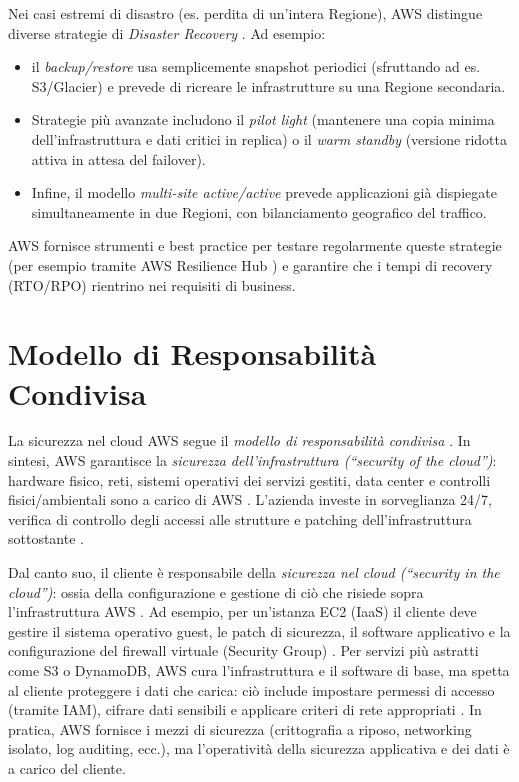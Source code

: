 Nei casi estremi di disastro (es. perdita di un’intera Regione), AWS distingue diverse strategie di \textit{Disaster Recovery} \cite{aws-well-architected}. Ad esempio:
\begin{itemize}
    \item il \textit{backup/restore} usa semplicemente snapshot periodici (sfruttando ad es. S3/Glacier) e prevede di ricreare le infrastrutture su una Regione secondaria.
    \item Strategie più avanzate includono il \textit{pilot light} (mantenere una copia minima dell’infrastruttura e dati critici in replica) o il \textit{warm standby} (versione ridotta attiva in attesa del failover).
    \item Infine, il modello \textit{multi-site active/active} prevede applicazioni già dispiegate simultaneamente in due Regioni, con bilanciamento geografico del traffico.
\end{itemize}
AWS fornisce strumenti e best practice per testare regolarmente queste strategie (per esempio tramite AWS Resilience Hub \cite{aws-resilience}) e garantire che i tempi di recovery (RTO/RPO) rientrino nei requisiti di business.

\section{Modello di Responsabilità Condivisa}
La sicurezza nel cloud AWS segue il \textit{modello di responsabilità condivisa} \cite{aws-shared-responsibility}. In sintesi, AWS garantisce la \textit{sicurezza dell’infrastruttura (“security of the cloud”)}: hardware fisico, reti, sistemi operativi dei servizi gestiti, data center e controlli fisici/ambientali sono a carico di AWS \cite{aws-shared-responsibility}. L’azienda investe in sorveglianza 24/7, verifica di controllo degli accessi alle strutture e patching dell’infrastruttura sottostante \cite{aws-shared-responsibility}.

Dal canto suo, il cliente è responsabile della \textit{sicurezza nel cloud (“security in the cloud”)}: ossia della configurazione e gestione di ciò che risiede sopra l’infrastruttura AWS \cite{aws-shared-responsibility}. Ad esempio, per un’istanza EC2 (IaaS) il cliente deve gestire il sistema operativo guest, le patch di sicurezza, il software applicativo e la configurazione del firewall virtuale (Security Group) \cite{aws-shared-responsibility}. Per servizi più astratti come S3 o DynamoDB, AWS cura l’infrastruttura e il software di base, ma spetta al cliente proteggere i dati che carica: ciò include impostare permessi di accesso (tramite IAM), cifrare dati sensibili e applicare criteri di rete appropriati \cite{aws-shared-responsibility}. In pratica, AWS fornisce i mezzi di sicurezza (crittografia a riposo, networking isolato, log auditing, ecc.), ma l’operatività della sicurezza applicativa e dei dati è a carico del cliente.

